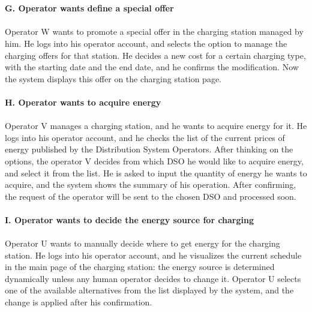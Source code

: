\documentclass[../main.tex]{subfiles}
\begin{document}
\vspace{2em}
\\
\\
\textbf{G. Operator wants define a special offer}
\vspace{-0.7em}
\\
\\
Operator W wants to promote a special offer in the charging station managed by him. He logs into his operator account, and selects the option to manage the charging offers for that station. He decides a new cost for a certain charging type, with the starting date and the end date, and he confirms the modification. Now the system displays this offer on the charging station page.
\vspace{2em}
\\
\\
\textbf{H. Operator wants to acquire energy}
\vspace{-0.7em}
\\
\\
Operator V manages a charging station, and he wants to acquire energy for it. He logs into his operator account, and he checks the list of the current prices of energy published by the Distribution System Operators. After thinking on the options, the operator V decides from which DSO he would like to acquire energy, and select it from the list. He is asked to input the quantity of energy he wants to acquire, and the system shows the summary of his operation. After confirming, the request of the operator will be sent to the chosen DSO and processed soon. 
\vspace{2em}
\\
\\
\textbf{I. Operator wants to decide the energy source for charging}
\vspace{-0.7em}
\\
\\
Operator U wants to manually decide where to get energy for the charging station. He logs into his operator account, and he visualizes the current schedule in the main page of the charging station: the energy source is determined dynamically unless any human operator decides to change it. Operator U selects one of the available alternatives from the list displayed by the system, and the change is applied after his confirmation. 
\vspace{2em}
\end{document}
